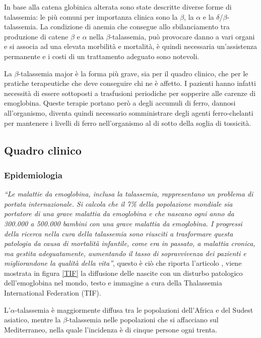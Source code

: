\documentclass[12pt,a4paper,openright,twoside]{report}
\begin{document}
In base alla catena globinica alterata sono state descritte diverse forme di talassemia: le più comuni per importanza clinica sono la $\beta$, la $\alpha$ e la $\delta$/$\beta$-talassemia\cite{atzeni2002beta}. 
La condizione di anemia che consegue allo sbilanciamento tra produzione di catene $\beta$ e $\alpha$ nella $\beta$-talassemia, può provocare danno a vari organi e si associa ad una elevata morbilità e mortalità, è quindi necessaria un'assistenza permanente e i costi di un trattamento adeguato sono notevoli\cite{cao2010beta}.

La $\beta$-talassemia major è la forma più grave, sia per il quadro clinico, che per le pratiche terapeutiche che deve conseguire chi ne è affetto. I pazienti hanno infatti necessità di essere sottoposti a trasfusioni periodiche per sopperire alle carenze di emoglobina. 
Queste terapie portano però a degli accumuli di ferro, dannosi all'organismo, diventa quindi necessario somministrare degli agenti ferro-chelanti per mantenere i livelli di ferro nell'organismo al di sotto della soglia di tossicità\cite{sanna2006capacita}. 

\subsection{Quadro clinico}
\subsubsection{Epidemiologia}
\textit{``Le malattie da emoglobina, inclusa la talassemia, rappresentano un problema di portata internazionale. Si calcola che il 7\% della popolazione mondiale sia portatore di una grave malattia da emoglobina e che nascano ogni anno da 300.000 a 500.000 bambini con una grave malattia da emoglobina. I progressi della ricerca nella cura della talassemia sono riusciti a trasformare questa patologia da causa di mortalità infantile, come era in passato, a malattia cronica, ma gestita adeguatamente, aumentando il tasso di sopravvivenza dei pazienti e migliorandone la qualità della vita''}, questo è ciò che riporta l'articolo \cite{TIF}, viene mostrata in figura \ref{TIF} la diffusione delle nascite con un disturbo patologico dell'emoglobina nel mondo, testo e immagine a cura della Thalassemia International Federation (TIF).

L'$\alpha$-talassemia è maggiormente diffusa tra le popolazioni dell'Africa e del Sudest asiatico, mentre la $\beta$-talassemia nelle popolazioni che si affacciano sul Mediterraneo, nella quale l'incidenza è di cinque persone ogni trenta\cite{muncie2009alpha}.
\end{document}
